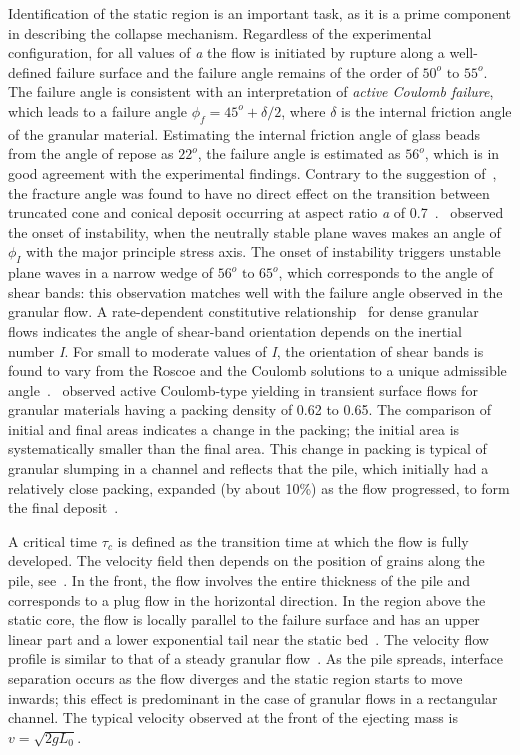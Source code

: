 Identification of the static region is an important task, as it is a prime 
component in describing the collapse mechanism. Regardless of the experimental 
configuration, for all values of \textit{a} the flow is initiated by rupture 
along a well-defined failure surface and the failure angle remains of the order 
of $50^{o} \mbox{ to } 55^{o}$. The failure angle is consistent with an 
interpretation of \textit{active Coulomb failure}, which leads to a failure 
angle $\phi_{\textit{f}}=45^{o}+\delta / 2$, where $\delta$ is the internal 
friction angle of the granular material. Estimating the internal friction angle 
of glass beads from the angle of repose as $22^{o}$, the failure angle is 
estimated as $56^{o}$, which is in good agreement with the experimental 
findings. Contrary to the suggestion of~\citet{Lajeunesse2004}, the fracture 
angle was found to have no direct effect on the transition between truncated 
cone and conical deposit occurring at aspect ratio \textit{a} of 
0.7~\citep{Lajeunesse2005}.~\citet{Schaeffer1990} observed the onset of 
instability, when the neutrally stable plane waves makes an angle of 
$\phi_{\textit{I}}$ with the major principle stress axis. The onset of 
instability triggers unstable plane waves in a narrow wedge of $56^{o}\mbox{ to 
}65^{o}$, which corresponds to the angle of shear bands: this observation 
matches well with the failure angle observed in the granular flow. A 
rate-dependent constitutive relationship~\citep{Jop2006} for dense granular 
flows indicates the angle of shear-band orientation depends on the inertial 
number \textit{I}. For small to moderate values of \textit{I}, the orientation 
of shear bands is found to vary from the Roscoe and the Coulomb solutions to a 
unique admissible angle~\citep{Lemiale2011}.~\citet{Daerr1999} observed active 
Coulomb-type yielding in transient surface flows for granular materials having 
a packing density of 0.62 to 0.65. The comparison of initial and final areas 
indicates a change in the packing; the initial area is systematically smaller 
than the final area. This change in packing is typical of granular slumping in 
a channel and reflects that the pile, which initially had a relatively close 
packing, expanded (by about 10\%) as the flow progressed, to form the final 
deposit~\citep{Balmforth2005}.

A critical time $\tau_{\textit{c}}$ is defined as the transition time at which 
the flow is fully developed. The velocity field then depends on the position of 
grains along the pile, see~\citet{Lajeunesse2005}. In the front, the flow 
involves the entire thickness of the pile and corresponds to a plug flow in the 
horizontal direction. In the region above the static core, the flow is locally 
parallel to the failure surface and has an upper linear part and a lower 
exponential tail near the static bed~\citep{Lajeunesse2005}. The velocity flow 
profile is similar to that of a steady granular flow~\citep{Midi2004}. As the 
pile spreads, interface separation occurs as the flow diverges and the static 
region starts to move inwards; this effect is predominant in the case of 
granular flows in a rectangular channel. The typical velocity observed at the 
front of the ejecting mass is 
$\textit{v}=\sqrt{2\textit{g}\textit{L}_{\textit{0}}}$. 

